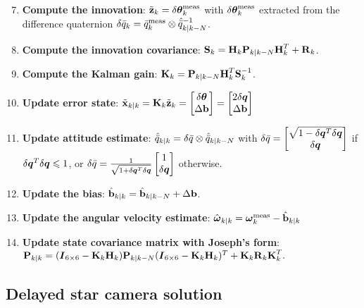 \begin{enumerate}
\setcounter{enumi}{6}
\item \textbf{Compute the innovation}: $\tilde{\textrm{\textbf{z}}}_{k} =  \delta\boldsymbol\theta^\textrm{meas}_{k}$ with $\delta\boldsymbol\theta^\textrm{meas}_{k}$ extracted from the difference quaternion $\delta\bar{q}_{k} = \bar{q}^{\textrm{meas}}_{k} \otimes \hat{\bar{q}}^{-1}_{k|k-N}$. 
\item \textbf{Compute the innovation covariance}: $\textrm{\textbf{S}}_{k} = \textrm{\textbf{H}}_{k}\textrm{\textbf{P}}_{k|k-N}\textrm{\textbf{H}}^T_{k} + \textrm{\textbf{R}}_{k}$.
\item \textbf{Compute the Kalman gain}: $\textrm{\textbf{K}}_{k} = \textrm{\textbf{P}}_{k|k-N}\textrm{\textbf{H}}^T_{k}\textrm{\textbf{S}}^{-1}_{k}$.
\item \textbf{Update error state}: $\tilde{\textrm{\textbf{x}}}_{k|k} = \textrm{\textbf{K}}_{k} \tilde{\textrm{\textbf{z}}}_{k} = \begin{bmatrix} \delta\boldsymbol\theta \\ \Delta\textrm{\textbf{b}}\end{bmatrix} = \begin{bmatrix} 2\delta\boldsymbol{q} \\ \Delta\textrm{\textbf{b}}\end{bmatrix}$
\item \textbf{Update attitude estimate}: $\hat{\bar{q}}_{k|k} =\delta\bar{q}\otimes \hat{\bar{q}}_{k|k-N}$ with $\delta\bar{q} = \begin{bmatrix} \sqrt{1-\delta\boldsymbol{q}^T\delta\boldsymbol{q}} \\ \delta\boldsymbol{q}\end{bmatrix}$ if $\delta\boldsymbol{q}^T\delta\boldsymbol{q} \leqslant 1$, or $\delta\bar{q} = \frac{1}{\sqrt{1+\delta\boldsymbol{q}^T\delta\boldsymbol{q}}}\begin{bmatrix} 1 \\ \delta\boldsymbol{q} \end{bmatrix}$ otherwise.
\item \textbf{Update the bias}: $\hat{\textrm{\textbf{b}}}_{k|k} = \hat{\textrm{\textbf{b}}}_{k|k-N} + \Delta\textrm{\textbf{b}}$.
\item \textbf{Update the angular velocity estimate}: $\hat{\boldsymbol\omega}_{k|k} = \boldsymbol\omega_k^{\textrm{meas}} - \hat{\textrm{\textbf{b}}}_{k|k}$
\item \textbf{Update state covariance matrix with Joseph's form}: $\textrm{\textbf{P}}_{k|k} = (\boldsymbol{I}_{6\times 6} - \textrm{\textbf{K}}_{k}\textrm{\textbf{H}}_{k})\textrm{\textbf{P}}_{k|k-N}(\boldsymbol{I}_{6\times 6} - \textrm{\textbf{K}}_{k}\textrm{\textbf{H}}_{k})^T + \textrm{\textbf{K}}_{k}\textrm{\textbf{R}}_{k}\textrm{\textbf{K}}_{k}^T.$
\end{enumerate}

\subsection{Delayed star camera solution}

